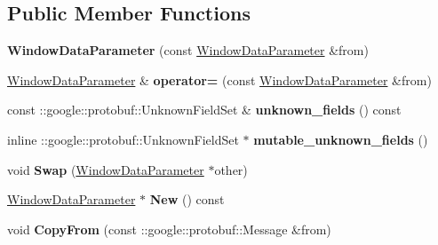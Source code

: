 \subsection*{Public Member Functions}
\begin{DoxyCompactItemize}
\item 
\mbox{\label{classcaffe_1_1_window_data_parameter_a5fdff1c7d6926e203823ee75a5dad8aa}} 
{\bfseries Window\+Data\+Parameter} (const \mbox{\hyperlink{classcaffe_1_1_window_data_parameter}{Window\+Data\+Parameter}} \&from)
\item 
\mbox{\label{classcaffe_1_1_window_data_parameter_ac6f421a04b00468a864674a835cd31b9}} 
\mbox{\hyperlink{classcaffe_1_1_window_data_parameter}{Window\+Data\+Parameter}} \& {\bfseries operator=} (const \mbox{\hyperlink{classcaffe_1_1_window_data_parameter}{Window\+Data\+Parameter}} \&from)
\item 
\mbox{\label{classcaffe_1_1_window_data_parameter_ae62b4157c604a5ac3f3f7e5731960f51}} 
const \+::google\+::protobuf\+::\+Unknown\+Field\+Set \& {\bfseries unknown\+\_\+fields} () const
\item 
\mbox{\label{classcaffe_1_1_window_data_parameter_a5893f671cecf6372697d171b0232eb54}} 
inline \+::google\+::protobuf\+::\+Unknown\+Field\+Set $\ast$ {\bfseries mutable\+\_\+unknown\+\_\+fields} ()
\item 
\mbox{\label{classcaffe_1_1_window_data_parameter_abe7e090a55e32e01b52e090e45e5cc7b}} 
void {\bfseries Swap} (\mbox{\hyperlink{classcaffe_1_1_window_data_parameter}{Window\+Data\+Parameter}} $\ast$other)
\item 
\mbox{\label{classcaffe_1_1_window_data_parameter_afad609d5a4d9ce620b71183073d34831}} 
\mbox{\hyperlink{classcaffe_1_1_window_data_parameter}{Window\+Data\+Parameter}} $\ast$ {\bfseries New} () const
\item 
\mbox{\label{classcaffe_1_1_window_data_parameter_a8735ec35a747432ac13e5c51f6bc8efd}} 
void {\bfseries Copy\+From} (const \+::google\+::protobuf\+::\+Message \&from)

\end{DoxyCompactItemize}
